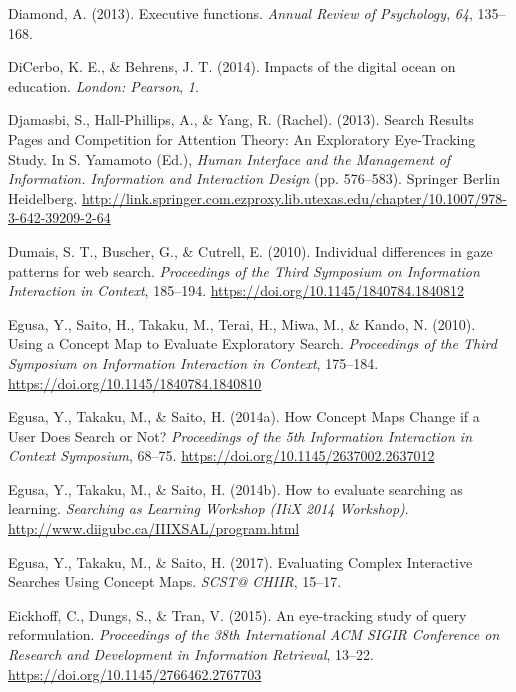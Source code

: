 \documentclass[letterpaper, nobind]{templates/ociamthesis}
\newlength{\cslhangindent}
\newenvironment{CSLReferences}[2] %
 {%
  \setlength{\parindent}{0pt}
  \ifodd #1
  \let\oldpar\par
  \def\par{\hangindent=\cslhangindent\oldpar}
  \fi
  \setlength{\parskip}{1mm}
  \setlength{\baselineskip}{6mm}
 }%
 {}
\begin{document}
\begin{CSLReferences}{1}{0}
\leavevmode{}%
Diamond, A. (2013). Executive functions. \emph{Annual Review of Psychology}, \emph{64}, 135--168.

\leavevmode{}%
DiCerbo, K. E., \& Behrens, J. T. (2014). Impacts of the digital ocean on education. \emph{London: Pearson}, \emph{1}.

\leavevmode{}%
Djamasbi, S., Hall-Phillips, A., \& Yang, R. (Rachel). (2013). Search {Results Pages} and {Competition} for {Attention Theory}: {An Exploratory Eye}-{Tracking Study}. In S. Yamamoto (Ed.), \emph{Human {Interface} and the {Management} of {Information}. {Information} and {Interaction Design}} (pp. 576--583). {Springer Berlin Heidelberg}. \url{http://link.springer.com.ezproxy.lib.utexas.edu/chapter/10.1007/978-3-642-39209-2-64}

\leavevmode{}%
Dumais, S. T., Buscher, G., \& Cutrell, E. (2010). Individual differences in gaze patterns for web search. \emph{Proceedings of the Third Symposium on Information Interaction in Context}, 185--194. \url{https://doi.org/10.1145/1840784.1840812}

\leavevmode{}%
Egusa, Y., Saito, H., Takaku, M., Terai, H., Miwa, M., \& Kando, N. (2010). Using a {Concept Map} to {Evaluate Exploratory Search}. \emph{Proceedings of the {Third Symposium} on {Information Interaction} in {Context}}, 175--184. \url{https://doi.org/10.1145/1840784.1840810}

\leavevmode{}%
Egusa, Y., Takaku, M., \& Saito, H. (2014a). How {Concept Maps Change} if a {User Does Search} or {Not}? \emph{Proceedings of the 5th {Information Interaction} in {Context Symposium}}, 68--75. \url{https://doi.org/10.1145/2637002.2637012}

\leavevmode{}%
Egusa, Y., Takaku, M., \& Saito, H. (2014b). How to evaluate searching as learning. \emph{Searching as {Learning Workshop} ({IIiX} 2014 Workshop)}. \url{http://www.diigubc.ca/IIIXSAL/program.html}

\leavevmode{}%
Egusa, Y., Takaku, M., \& Saito, H. (2017). Evaluating {Complex Interactive Searches Using Concept Maps}. \emph{{SCST}@ {CHIIR}}, 15--17.

\leavevmode{}%
Eickhoff, C., Dungs, S., \& Tran, V. (2015). An eye-tracking study of query reformulation. \emph{Proceedings of the 38th International {ACM SIGIR} Conference on Research and Development in Information Retrieval}, 13--22. \url{https://doi.org/10.1145/2766462.2767703}


\end{CSLReferences}
\end{document}
